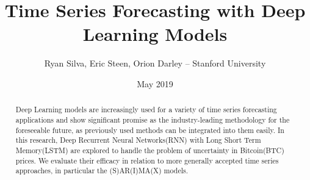 \documentclass{article}
\title{Time Series Forecasting with Deep Learning Models}
\author{Ryan Silva, Eric Steen, Orion Darley – Stanford University }
\date{May 2019}
\begin{document}
\maketitle

\begin{abstract}
Deep Learning models are increasingly used for a variety of time series forecasting applications and show significant promise as the industry-leading methodology for the foreseeable future, as previously used methods can be integrated into them easily. In this research, Deep Recurrent Neural Networks(RNN) with Long Short Term Memory(LSTM) are explored to handle the problem of uncertainty in Bitcoin(BTC) prices. We evaluate their efficacy in relation to more generally accepted time series approaches, in particular the (S)AR(I)MA(X) models.
\end{abstract}
\end{document}
